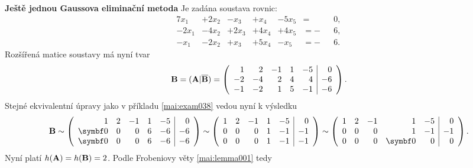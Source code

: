 \wikitextrule
\begin{example}\label{mai:exam039}
  \textbf{Ještě jednou Gaussova eliminační metoda}\newline\small
  Je zadána soustava rovnic:
  \begin{alignat*}{7}
      x_1 &+ 2x_2 &-  x_3 &+  x_4 &- 5x_5 &=  &&0, \\
    -2x_1 &- 4x_2 &+ 2x_3 &+ 4x_4 &+ 4x_5 &= -&&6, \\
     -x_1 &- 2x_2 &+  x_3 &+ 5x_4 &-  x_5 &= -&&6.
  \end{alignat*}
  Rozšířená matice soustavy má nyní tvar 
  \begin{equation*}
    \mathbf{B} = (\mathbf{A}|\overline{\mathbf{B}}) =
    \left(
      \begin{array}{rrrrr|r}
         1 &  2 & -1 & 1 & -5 &  0    \\
        -2 & -4 &  2 & 4 &  4 & -6    \\
        -1 & -2 &  1 & 5 & -1 & -6
      \end{array}
    \right).
  \end{equation*}
  Stejné ekvivalentní úpravy jako v příkladu \ref{mai:exam038} vedou nyní k výsledku
  \footnotesize %
  \begin{equation*}
    \matr{B} \sim
    \left(
      \begin{array}{rrrrr|r}
         1 &  2 & -1 & 1 & -5 &  0         \\
         \bm{0} &  0 &  0 & 6 & -6 & -6    \\
         \bm{0} &  0 &  0 & 6 & -6 & -6
      \end{array}
    \right) \sim
    \left(
      \begin{array}{rrrrr|r}
              1 &  2 & -1 & 1 & -5 &  0    \\
              0 &  0 &  0 & 1 & -1 & -1    \\
              0 &  0 &  0 & 1 & -1 & -1
      \end{array}
    \right) \sim
    \left(
      \begin{array}{rrrrr|r}
              1 &  2 & -1 & 1      & -5 &  0    \\
              0 &  0 &  0 & 1      & -1 & -1    \\
              0 &  0 &  0 & \bm{0} &  0 &  0
      \end{array}
    \right).
  \end{equation*}\normalsize
  Nyní platí \(h(\mathbf{A}) = h(\mathbf{B}) = 2\). Podle Frobeniovy věty \ref{mai:lemma001} tedy 

\end{example}
